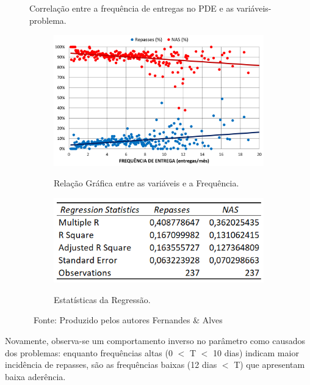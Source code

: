  \begin{figure}[H]
     \caption{Correlação entre a frequência de entregas no PDE e as variáveis-problema.}
     \begin{subfigure}{.64\textwidth}
         \centering
         \caption{Relação Gráfica entre as variáveis e a Frequência.}
         \includegraphics[width=.98\linewidth]{images/5_emp_bebidas/excel_based/Frequencia.png}
         \label{fig:Frequencia1}
     \end{subfigure}
     \begin{subfigure}{.35\textwidth}
       \centering
       \caption{Estatísticas da Regressão.}
       \includegraphics[width=.88\linewidth]{images/5_emp_bebidas/excel_based/Frequencia_RS.png}
       \label{fig:Frequencia2}
     \end{subfigure}
     \caption*{\ Fonte: Produzido pelos autores Fernandes \& Alves}
 \end{figure} %

Novamente, observa-se um comportamento inverso no parâmetro como causados dos problemas: enquanto frequências altas (0 $<$ T $<$ 10 dias) indicam maior incidência de repasses, são as frequências baixas (12 dias $<$ T) que apresentam baixa aderência.

